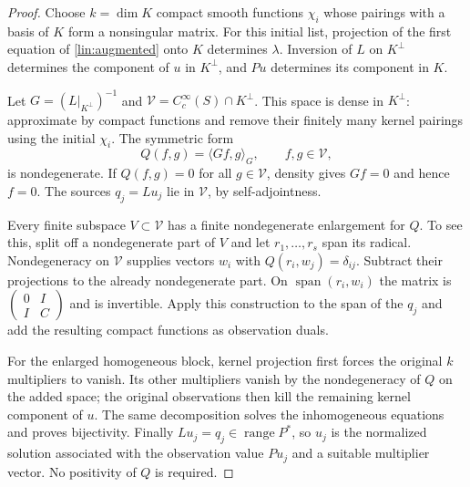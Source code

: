 \begin{proof}
Choose $k=\dim K$ compact smooth functions $\chi_i$ whose pairings with a
basis of $K$ form a nonsingular matrix.  For this initial list, projection
of the first equation of \eqref{lin:augmented} onto $K$ determines
$\lambda$.  Inversion of $L$ on $K^\perp$ determines the component of
$u$ in $K^\perp$, and $Pu$ determines its component in $K$.

Let $G=(L|_{K^\perp})^{-1}$ and
$\mathcal V=C_c^\infty(S)\cap K^\perp$.  This space is dense in
$K^\perp$: approximate by compact functions and remove their finitely
many kernel pairings using the initial $\chi_i$.  The symmetric form
\[
 Q(f,g)=\langle Gf,g\rangle_G,\qquad f,g\in\mathcal V,
\]
is nondegenerate.  If $Q(f,g)=0$ for all $g\in\mathcal V$, density gives
$Gf=0$ and hence $f=0$.  The sources $q_j=Lu_j$ lie in $\mathcal V$,
by self-adjointness.

Every finite subspace $V\subset\mathcal V$ has a finite nondegenerate
enlargement for $Q$.  To see this, split off a nondegenerate part of $V$
and let $r_1,\ldots,r_s$ span its radical.  Nondegeneracy on
$\mathcal V$ supplies vectors $w_i$ with $Q(r_i,w_j)=\delta_{ij}$.
Subtract their projections to the already nondegenerate part.  On
$\operatorname{span}(r_i,w_i)$ the matrix is
$\left(\begin{smallmatrix}0&I\\I&C\end{smallmatrix}\right)$ and is
invertible.  Apply this construction to the span of the $q_j$ and add
the resulting compact functions as observation duals.

For the enlarged homogeneous block, kernel projection first forces the
original $k$ multipliers to vanish.  Its other multipliers vanish by the
nondegeneracy of $Q$ on the added space; the original observations then
kill the remaining kernel component of $u$.  The same decomposition
solves the inhomogeneous equations and proves bijectivity.  Finally
$Lu_j=q_j\in\operatorname{range}P^*$, so $u_j$ is the normalized
solution associated with the observation value $Pu_j$ and a suitable
multiplier vector.  No positivity of $Q$ is required.
\end{proof}

